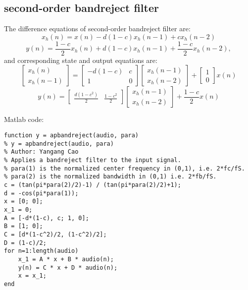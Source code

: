 \documentclass[10pt,a4paper,oneside]{beamer}
\begin{document}
\subsection{second-order bandreject filter}
\begin{frame}
The difference equations of second-order bandreject filter are: 
\[
x_h(n) = x(n) - d(1-c)x_h(n-1) + cx_h(n-2)
\]
\[
y(n) = \frac{1-c}{2}x_h(n) + d(1-c)x_h(n-1) + \frac{1-c}{2}x_h(n-2),
\]
and corresponding state and output equations are:
\[
\begin{bmatrix}x_h(n)\\x_h(n-1)\end{bmatrix} = \begin{bmatrix}
-d(1-c)&c\\
1&0
\end{bmatrix}
\begin{bmatrix}x_h(n-1)\\x_h(n-2)\end{bmatrix} + \begin{bmatrix}1\\0\end{bmatrix}
x(n)\]
\[
y(n) = \begin{bmatrix}\frac{d(1-c^2)}{2}&\frac{1-c^2}{2}\end{bmatrix}
\begin{bmatrix}x_h(n-1)\\x_h(n-2)\end{bmatrix} + \frac{1-c}{2}x(n)
\]
\end{frame}
\begin{frame}[fragile]
Matlab code:
\begin{lstlisting}
function y = apbandreject(audio, para)
% y = apbandreject(audio, para)
% Author: Yangang Cao
% Applies a bandreject filter to the input signal.
% para(1) is the normalized center frequency in (0,1), i.e. 2*fc/fS.
% para(2) is the normalized bandwidth in (0,1) i.e. 2*fb/fS.
c = (tan(pi*para(2)/2)-1) / (tan(pi*para(2)/2)+1);
d = -cos(pi*para(1));
x = [0; 0];
x_1 = 0;
A = [-d*(1-c), c; 1, 0];
B = [1; 0];
C = [d*(1-c^2)/2, (1-c^2)/2];
D = (1-c)/2;
for n=1:length(audio)
    x_1 = A * x + B * audio(n);
    y(n) = C * x + D * audio(n);
    x = x_1;
end
\end{lstlisting}
\end{frame}
\end{document}
